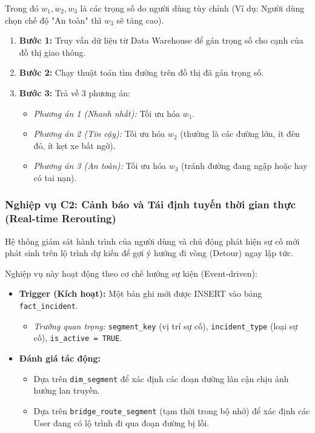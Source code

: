 Trong đó $w_1, w_2, w_3$ là các trọng số do người dùng tùy chỉnh (Ví dụ: Người dùng chọn chế độ "An toàn" thì $w_3$ sẽ tăng cao).
\begin{enumerate}
    \item \textbf{Bước 1:} Truy vấn dữ liệu từ Data Warehouse để gán trọng số cho cạnh của đồ thị giao thông.
    \item \textbf{Bước 2:} Chạy thuật toán tìm đường trên đồ thị đã gán trọng số.
    \item \textbf{Bước 3:} Trả về 3 phương án:
    \begin{itemize}
        \item \textit{Phương án 1 (Nhanh nhất):} Tối ưu hóa $w_1$.
        \item \textit{Phương án 2 (Tin cậy):} Tối ưu hóa $w_2$ (thường là các đường lớn, ít đèn đỏ, ít kẹt xe bất ngờ).
        \item \textit{Phương án 3 (An toàn):} Tối ưu hóa $w_3$ (tránh đường đang ngập hoặc hay có tai nạn).
    \end{itemize}
\end{enumerate}

\subsubsection{Nghiệp vụ C2: Cảnh báo và Tái định tuyến thời gian thực (Real-time Rerouting)}

Hệ thống giám sát hành trình của người dùng và chủ động phát hiện sự cố mới phát sinh trên lộ trình dự kiến để gợi ý hướng đi vòng (Detour) ngay lập tức.

Nghiệp vụ này hoạt động theo cơ chế hướng sự kiện (Event-driven):

\begin{itemize}
    \item \textbf{Trigger (Kích hoạt):} Một bản ghi mới được INSERT vào bảng \texttt{fact\_incident}.
    \begin{itemize}
        \item \textit{Trường quan trọng:} \texttt{segment\_key} (vị trí sự cố), \texttt{incident\_type} (loại sự cố), \texttt{is\_active = TRUE}.
    \end{itemize}
    \item \textbf{Đánh giá tác động:}
    \begin{itemize}
        \item Dựa trên \texttt{dim\_segment} để xác định các đoạn đường lân cận chịu ảnh hưởng lan truyền.
        \item Dựa trên \texttt{bridge\_route\_segment} (tạm thời trong bộ nhớ) để xác định các User đang có lộ trình đi qua đoạn đường bị lỗi.
    \end{itemize}
\end{itemize}

